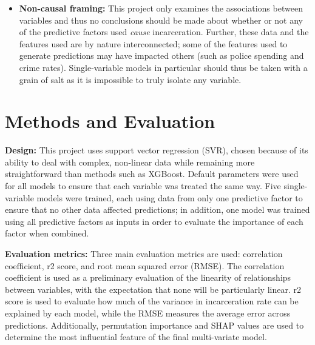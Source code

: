 \documentclass[
  letterpaper,
  DIV=11,
  numbers=noendperiod]{scrartcl}
\begin{document}
\begin{itemize}
  of complete data. Additionally, several states have changed their
  reporting practices over time, which means that newer numbers may not
  be directly comparable to those collected previously. Finally, the SRS
  only collected information about the most serious offense that
  occurred in a given incident (e.g.~if a homicide occurred in the
  course of a motor vehicle theft, only the homicide would be recorded),
  meaning that these data give us a clearer picture of the number of
  incidents that occurred rather than the actual total number of crimes.
\item
  \textbf{Non-causal framing:} This project only examines the
  associations between variables and thus no conclusions should be made
  about whether or not any of the predictive factors used \emph{cause}
  incarceration. Further, these data and the features used are by nature
  interconnected; some of the features used to generate predictions may
  have impacted others (such as police spending and crime rates).
  Single-variable models in particular should thus be taken with a grain
  of salt as it is impossible to truly isolate any variable.
\end{itemize}

\section{Methods and Evaluation}\label{methods-and-evaluation}

\textbf{Design:} This project uses support vector regression (SVR),
chosen because of its ability to deal with complex, non-linear data
while remaining more straightforward than methods such as XGBoost.
Default parameters were used for all models to ensure that each variable
was treated the same way. Five single-variable models were trained, each
using data from only one predictive factor to ensure that no other data
affected predictions; in addition, one model was trained using all
predictive factors as inputs in order to evaluate the importance of each
factor when combined.

\textbf{Evaluation metrics:} Three main evaluation metrics are used:
correlation coefficient, r2 score, and root mean squared error (RMSE).
The correlation coefficient is used as a preliminary evaluation of the
linearity of relationships between variables, with the expectation that
none will be particularly linear. r2 score is used to evaluate how much
of the variance in incarceration rate can be explained by each model,
while the RMSE measures the average error across predictions.
Additionally, permutation importance and SHAP values are used to
determine the most influential feature of the final multi-variate model.
\end{document}
